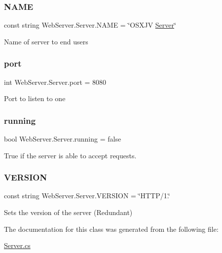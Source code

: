 \subsubsection{\texorpdfstring{N\+A\+ME}{NAME}}
{\footnotesize\ttfamily const string Web\+Server.\+Server.\+N\+A\+ME = \char`\"{}O\+S\+X\+JV \hyperlink{class_web_server_1_1_server}{Server}\char`\"{}}



Name of server to end users 

\mbox{\label{class_web_server_1_1_server_a36d33c2119e76991cc667cef94f3a051}} 
\subsubsection{\texorpdfstring{port}{port}}
{\footnotesize\ttfamily int Web\+Server.\+Server.\+port = 8080\hspace{0.3cm}{\ttfamily [private]}}



Port to listen to one 

\mbox{\label{class_web_server_1_1_server_aea270e1d81ce0cd9fab583d7c5b3d607}} 
\subsubsection{\texorpdfstring{running}{running}}
{\footnotesize\ttfamily bool Web\+Server.\+Server.\+running = false\hspace{0.3cm}{\ttfamily [static]}}



True if the server is able to accept requests. 

\mbox{\label{class_web_server_1_1_server_a53e42e0cb8e8839b6afb16828752a393}} 
\subsubsection{\texorpdfstring{V\+E\+R\+S\+I\+ON}{VERSION}}
{\footnotesize\ttfamily const string Web\+Server.\+Server.\+V\+E\+R\+S\+I\+ON = \char`\"{}H\+T\+TP/1.\char`\"{}}



Sets the version of the server (Redundant) 



The documentation for this class was generated from the following file\+:\begin{DoxyCompactItemize}
\item 
\hyperlink{_server_8cs}{Server.\+cs}\end{DoxyCompactItemize}
